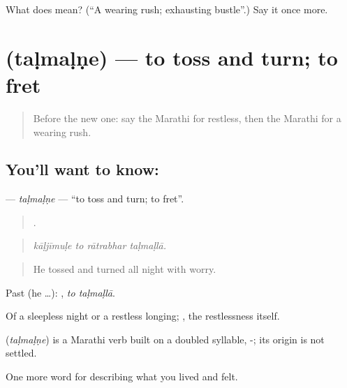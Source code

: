 \begin{tcolorbox}[breakable,colback=teal!4,colframe=teal!35!black,title={Before you move on}]
What does  mean? (\textquotedblleft{}A wearing rush; exhausting bustle\textquotedblright{}.) Say it once more.
\end{tcolorbox}
\section[\texorpdfstring{\mr{तळमळणे} (taḷmaḷṇe)}{तळमळणे (taḷmaḷṇe)}]{ (taḷmaḷṇe) — to toss and turn; to fret}

\label{lesson:MR-C455-talmalne}



\begin{quote}
Before the new one: say the Marathi for restless, then the Marathi for a wearing rush.
\end{quote}

\subsection*{You'll want to know: }
\textbf{} — \emph{taḷmaḷṇe} — \textquotedblleft{}to toss and turn; to fret\textquotedblright{}.

\begin{quote}
   .
\end{quote}

\begin{quote}
\emph{kāḷjīmuḷe to rātrabhar taḷmaḷlā.}
\end{quote}

\begin{quote}
He tossed and turned all night with worry.
\end{quote}

Past (he …):  , \emph{to taḷmaḷlā}.

Of a sleepless night or a restless longing; , the restlessness itself.

\begin{cousinweb}
\textbf{} (\emph{taḷmaḷṇe}) is a Marathi verb built on a doubled syllable, -; its origin is not settled.
\end{cousinweb}

\begin{grammarlens}[title={What you've built}]
One more word for describing what you lived and felt.
\end{grammarlens}

